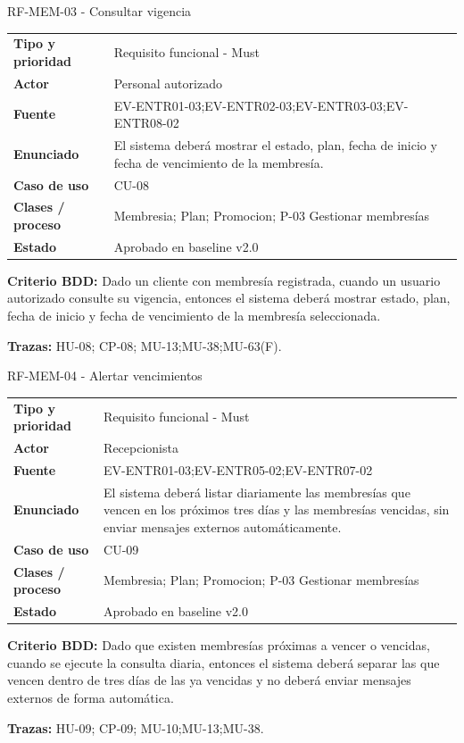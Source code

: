 \begin{reqbox}{RF-MEM-03 - Consultar vigencia}
\begin{tabularx}{\textwidth}{>{\bfseries}p{3.2cm}Y}
Tipo y prioridad & Requisito funcional - Must \\
Actor & Personal autorizado \\
Fuente & EV-ENTR01-03;EV-ENTR02-03;EV-ENTR03-03;EV-ENTR08-02 \\
Enunciado & El sistema deberá mostrar el estado, plan, fecha de inicio y fecha de vencimiento de la membresía. \\
Caso de uso & CU-08 \\
Clases / proceso & Membresia; Plan; Promocion; P-03 Gestionar membresías \\
Estado & Aprobado en baseline v2.0 \\
\end{tabularx}
\textbf{Criterio BDD:} Dado un cliente con membresía registrada, cuando un usuario autorizado consulte su vigencia, entonces el sistema deberá mostrar estado, plan, fecha de inicio y fecha de vencimiento de la membresía seleccionada.

\textbf{Trazas:} HU-08; CP-08; MU-13;MU-38;MU-63(F).
\end{reqbox}


\begin{reqbox}{RF-MEM-04 - Alertar vencimientos}
\begin{tabularx}{\textwidth}{>{\bfseries}p{3.2cm}Y}
Tipo y prioridad & Requisito funcional - Must \\
Actor & Recepcionista \\
Fuente & EV-ENTR01-03;EV-ENTR05-02;EV-ENTR07-02 \\
Enunciado & El sistema deberá listar diariamente las membresías que vencen en los próximos tres días y las membresías vencidas, sin enviar mensajes externos automáticamente. \\
Caso de uso & CU-09 \\
Clases / proceso & Membresia; Plan; Promocion; P-03 Gestionar membresías \\
Estado & Aprobado en baseline v2.0 \\
\end{tabularx}
\textbf{Criterio BDD:} Dado que existen membresías próximas a vencer o vencidas, cuando se ejecute la consulta diaria, entonces el sistema deberá separar las que vencen dentro de tres días de las ya vencidas y no deberá enviar mensajes externos de forma automática.

\textbf{Trazas:} HU-09; CP-09; MU-10;MU-13;MU-38.
\end{reqbox}


